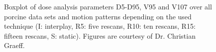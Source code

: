 \documentclass[type=dr, dr=rernat, accentcolor=tud7b,colorbacktitle, bigchapter, openright, twoside, 12pt ]{tudthesis}
\begin{document}
\begin{figure}[H]
{ }
\caption{Boxplot of dose analysis parameters D5-D95, V95 and V107 over all porcine data sets and motion patterns depending on 
the used technique (I: interplay, R5: five rescans, R10: ten rescans, R15: fifteen rescans, S: static). Figures are courtesy of Dr. Christian 
Graeff.}
\label{static_interplay_rescanning_ALLpigs_KORR}
\end{figure}

\end{document}
